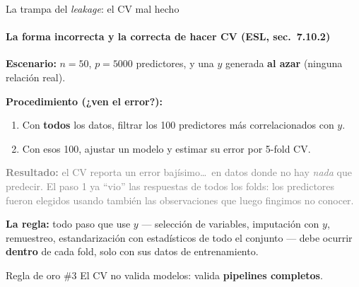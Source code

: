 \documentclass{beamer}
\newcommand{\1}{\mathbb{I}}
\begin{document}
\begin{frame}{La trampa del \emph{leakage}: el CV mal hecho}
\framesubtitle{La forma incorrecta y la correcta de hacer CV (ESL, sec.\ 7.10.2)}
\small
\textbf{Escenario:} $n = 50$, $p = 5000$ predictores, y una $y$ generada \textbf{al azar} (ninguna relación real).

\vspace{0.15cm}
\textbf{Procedimiento (¿ven el error?):}
\begin{enumerate}\itemsep3pt
  \item Con \textbf{todos} los datos, filtrar los 100 predictores más correlacionados con $y$.
  \item Con esos 100, ajustar un modelo y estimar su error por 5-fold CV.
\end{enumerate}
\pause

\textcolor{gray}{\textbf{Resultado:} el CV reporta un error bajísimo\ldots\ en datos donde no hay \emph{nada} que predecir. El paso 1 ya ``vio'' las respuestas de todos los folds: los predictores fueron elegidos usando también las observaciones que luego fingimos no conocer.}
\pause

\vspace{0.2cm}
\textbf{La regla:} todo paso que use $y$ --- selección de variables, imputación con $y$, remuestreo, estandarización con estadísticos de todo el conjunto --- debe ocurrir \textbf{dentro} de cada fold, solo con sus datos de entrenamiento.
\pause

\begin{block}{Regla de oro \#3}
El CV no valida modelos: valida \textbf{pipelines completos}.
\end{block}
\end{frame}
\end{document}
